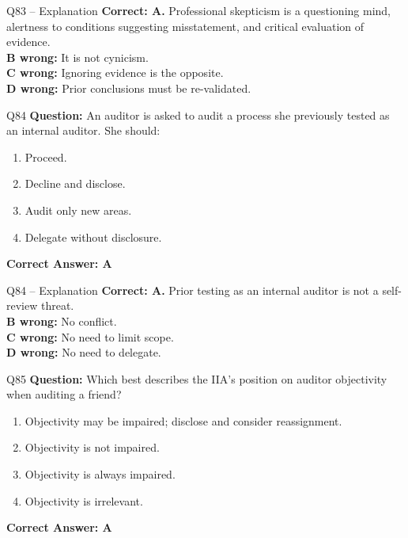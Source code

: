 \documentclass[aspectratio=169,10pt]{beamer}
\begin{document}
	\begin{frame}[t]{Q83 -- Explanation}
		\small
		\textbf{Correct: A.} Professional skepticism is a questioning mind, alertness to conditions suggesting misstatement, and critical evaluation of evidence. \\[4pt]
		\textbf{B wrong:} It is not cynicism. \\[2pt]
		\textbf{C wrong:} Ignoring evidence is the opposite. \\[2pt]
		\textbf{D wrong:} Prior conclusions must be re-validated.
	\end{frame}
	
	\begin{frame}[t]{Q84}
		\small
		\textbf{Question:} An auditor is asked to audit a process she previously tested as an internal auditor. She should:
		\begin{enumerate}[label=\Alph*.,itemsep=1pt,topsep=2pt]
			\item Proceed.
			\item Decline and disclose.
			\item Audit only new areas.
			\item Delegate without disclosure.
		\end{enumerate}
		\vspace{4pt}
		\textbf{Correct Answer: A}
	\end{frame}
	
	\begin{frame}[t]{Q84 -- Explanation}
		\small
		\textbf{Correct: A.} Prior testing as an internal auditor is not a self-review threat. \\[4pt]
		\textbf{B wrong:} No conflict. \\[2pt]
		\textbf{C wrong:} No need to limit scope. \\[2pt]
		\textbf{D wrong:} No need to delegate.
	\end{frame}
	
	\begin{frame}[t]{Q85}
		\small
		\textbf{Question:} Which best describes the IIA's position on auditor objectivity when auditing a friend?
		\begin{enumerate}[label=\Alph*.,itemsep=1pt,topsep=2pt]
			\item Objectivity may be impaired; disclose and consider reassignment.
			\item Objectivity is not impaired.
			\item Objectivity is always impaired.
			\item Objectivity is irrelevant.
		\end{enumerate}
		\vspace{4pt}
		\textbf{Correct Answer: A}
	\end{frame}
	
\end{document}
